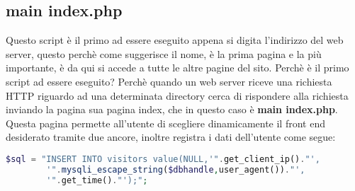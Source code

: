 \subsection{main index.php}
Questo script è il primo ad essere eseguito appena si digita l'indirizzo del web server, questo perchè come suggerisce il nome, è la prima pagina e la più importante, è da qui si accede a tutte le altre pagine del sito. Perchè è il primo script ad essere eseguito? Perchè quando un web server riceve una richiesta HTTP riguardo ad una determinata directory cerca di rispondere alla richiesta inviando la pagina sua pagina index, che in questo caso è \textbf{main index.php}. \newline Questa pagina permette all'utente di scegliere dinamicamente il front end desiderato tramite due ancore, inoltre registra i dati dell'utente come segue:
\begin{lstlisting}[language=PHP , caption=Query per l'inserimento dei dati dell'utente nella tabella visitors facendo ausilio delle funzioni definite nello script function.php ]
$sql = "INSERT INTO visitors value(NULL,'".get_client_ip()."',
		'".mysqli_escape_string($dbhandle,user_agent())."',
		'".get_time()."');";
\end{lstlisting}

